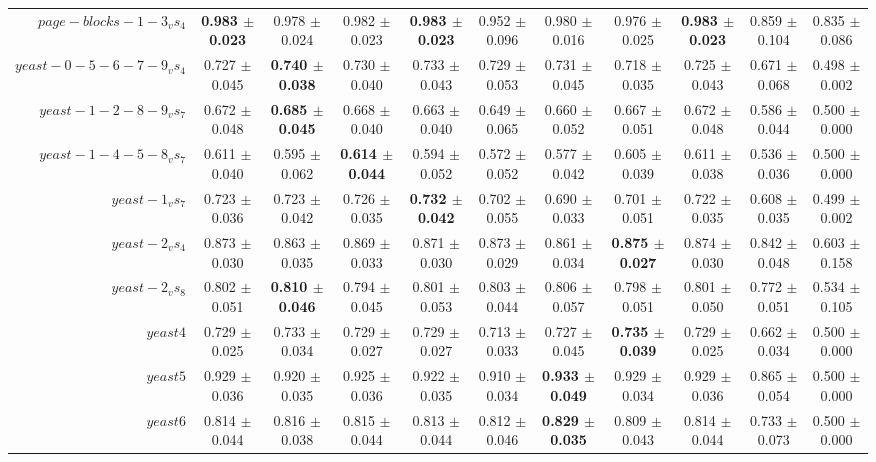 \begin{table}[!ht]
{\begin{tabular}{r c c c c c c c c c c}
$page-blocks-1-3_vs_4$ & \textbf{0.983 $\pm$ 0.023} & 0.978 $\pm$ 0.024 & 0.982 $\pm$ 0.023 & \textbf{0.983 $\pm$ 0.023} & 0.952 $\pm$ 0.096 & 0.980 $\pm$ 0.016 & 0.976 $\pm$ 0.025 & \textbf{0.983 $\pm$ 0.023} & 0.859 $\pm$ 0.104 & 0.835 $\pm$ 0.086 \\
$yeast-0-5-6-7-9_vs_4$ & 0.727 $\pm$ 0.045 & \textbf{0.740 $\pm$ 0.038} & 0.730 $\pm$ 0.040 & 0.733 $\pm$ 0.043 & 0.729 $\pm$ 0.053 & 0.731 $\pm$ 0.045 & 0.718 $\pm$ 0.035 & 0.725 $\pm$ 0.043 & 0.671 $\pm$ 0.068 & 0.498 $\pm$ 0.002 \\
$yeast-1-2-8-9_vs_7$ & 0.672 $\pm$ 0.048 & \textbf{0.685 $\pm$ 0.045} & 0.668 $\pm$ 0.040 & 0.663 $\pm$ 0.040 & 0.649 $\pm$ 0.065 & 0.660 $\pm$ 0.052 & 0.667 $\pm$ 0.051 & 0.672 $\pm$ 0.048 & 0.586 $\pm$ 0.044 & 0.500 $\pm$ 0.000 \\
$yeast-1-4-5-8_vs_7$ & 0.611 $\pm$ 0.040 & 0.595 $\pm$ 0.062 & \textbf{0.614 $\pm$ 0.044} & 0.594 $\pm$ 0.052 & 0.572 $\pm$ 0.052 & 0.577 $\pm$ 0.042 & 0.605 $\pm$ 0.039 & 0.611 $\pm$ 0.038 & 0.536 $\pm$ 0.036 & 0.500 $\pm$ 0.000 \\
$yeast-1_vs_7$ & 0.723 $\pm$ 0.036 & 0.723 $\pm$ 0.042 & 0.726 $\pm$ 0.035 & \textbf{0.732 $\pm$ 0.042} & 0.702 $\pm$ 0.055 & 0.690 $\pm$ 0.033 & 0.701 $\pm$ 0.051 & 0.722 $\pm$ 0.035 & 0.608 $\pm$ 0.035 & 0.499 $\pm$ 0.002 \\
$yeast-2_vs_4$ & 0.873 $\pm$ 0.030 & 0.863 $\pm$ 0.035 & 0.869 $\pm$ 0.033 & 0.871 $\pm$ 0.030 & 0.873 $\pm$ 0.029 & 0.861 $\pm$ 0.034 & \textbf{0.875 $\pm$ 0.027} & 0.874 $\pm$ 0.030 & 0.842 $\pm$ 0.048 & 0.603 $\pm$ 0.158 \\
$yeast-2_vs_8$ & 0.802 $\pm$ 0.051 & \textbf{0.810 $\pm$ 0.046} & 0.794 $\pm$ 0.045 & 0.801 $\pm$ 0.053 & 0.803 $\pm$ 0.044 & 0.806 $\pm$ 0.057 & 0.798 $\pm$ 0.051 & 0.801 $\pm$ 0.050 & 0.772 $\pm$ 0.051 & 0.534 $\pm$ 0.105 \\
$yeast4$ & 0.729 $\pm$ 0.025 & 0.733 $\pm$ 0.034 & 0.729 $\pm$ 0.027 & 0.729 $\pm$ 0.027 & 0.713 $\pm$ 0.033 & 0.727 $\pm$ 0.045 & \textbf{0.735 $\pm$ 0.039} & 0.729 $\pm$ 0.025 & 0.662 $\pm$ 0.034 & 0.500 $\pm$ 0.000 \\
$yeast5$ & 0.929 $\pm$ 0.036 & 0.920 $\pm$ 0.035 & 0.925 $\pm$ 0.036 & 0.922 $\pm$ 0.035 & 0.910 $\pm$ 0.034 & \textbf{0.933 $\pm$ 0.049} & 0.929 $\pm$ 0.034 & 0.929 $\pm$ 0.036 & 0.865 $\pm$ 0.054 & 0.500 $\pm$ 0.000 \\
$yeast6$ & 0.814 $\pm$ 0.044 & 0.816 $\pm$ 0.038 & 0.815 $\pm$ 0.044 & 0.813 $\pm$ 0.044 & 0.812 $\pm$ 0.046 & \textbf{0.829 $\pm$ 0.035} & 0.809 $\pm$ 0.043 & 0.814 $\pm$ 0.044 & 0.733 $\pm$ 0.073 & 0.500 $\pm$ 0.000 \\

\end{tabular}}
\end{table}
